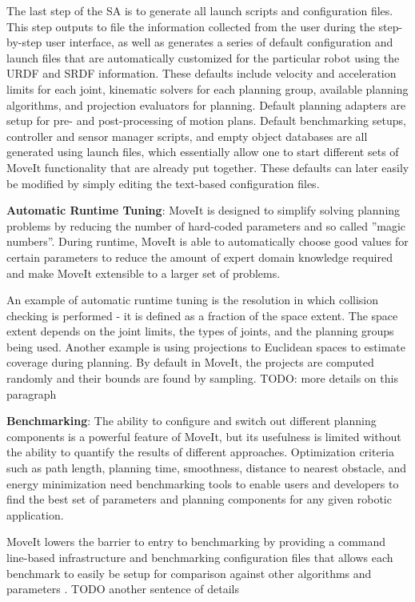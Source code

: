 \documentclass[10pt,journal,compsoc]{joser1}
\begin{document}
{The last step of the SA is to generate all launch scripts and configuration files. This step outputs to file the information collected from the user during the step-by-step user interface, as well as generates a series of default configuration and launch files that are automatically customized for the particular robot using the URDF and SRDF information. These defaults include velocity and acceleration limits for each joint, kinematic solvers for each planning group, available planning algorithms, and projection evaluators for planning. Default planning adapters are setup for pre- and post-processing of motion plans. Default benchmarking setups, controller and sensor manager scripts, and empty object databases are all generated using launch files, which essentially allow one to start different sets of MoveIt functionality that are already put together. These defaults can later easily be modified by simply editing the text-based configuration files.

{\bf Automatic Runtime Tuning}: MoveIt is designed to simplify solving planning problems by reducing the number of hard-coded parameters and so called ''magic numbers''. During runtime, MoveIt is able to automatically choose good values for certain parameters to reduce the amount of expert domain knowledge required and make MoveIt extensible to a larger set of problems. 

An example of automatic runtime tuning is the resolution in which collision checking is performed - it is defined as a fraction of the space extent. The space extent depends on the joint limits, the types of joints, and the planning groups being used. Another example is using projections to Euclidean spaces to estimate coverage during planning. By default in MoveIt, the projects are computed randomly and their bounds are found by sampling. TODO: more details on this paragraph

{\bf Benchmarking}: The ability to configure and switch out different planning components is a powerful feature of MoveIt, but its usefulness is limited without the ability to quantify the results of different approaches. Optimization criteria such as path length, planning time, smoothness, distance to nearest obstacle, and energy minimization need benchmarking tools to enable users and developers to find the best set of parameters and planning components for any given robotic application.

MoveIt lowers the barrier to entry to benchmarking by providing a command line-based infrastructure and benchmarking configuration files that allows each benchmark to easily be setup for comparison against other algorithms and parameters \cite{cohen2012generic}. TODO another sentence of details

}
\end{document}

